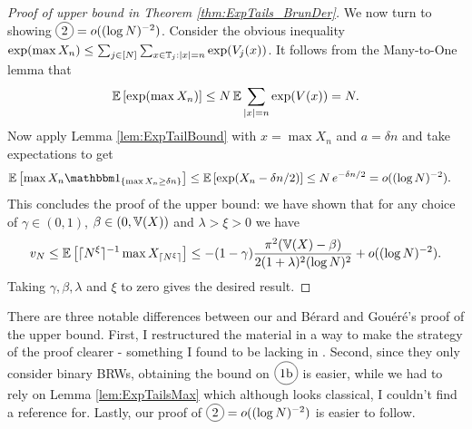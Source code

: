 \begin{proof}[Proof of upper bound in Theorem \ref{thm:ExpTails_BrunDer}]
We now turn to showing $\circled{2} = o((\log N)^{-2})$. Consider the obvious inequality $\exp(\max X_n) \leq \sum_{j \in [N]} \sum_{x \in \mathbb{T}_j : |x| = n} \exp(V_j(x))$. It follows from the Many-to-One lemma that 
\begin{align*}
\mathbb{E}\left[ \exp(\max X_n) \right] \leq N\, \mathbb{E}\sum\limits_{|x| = n} \exp(V(x)) = N. 
\end{align*}
Now apply Lemma \ref{lem:ExpTailBound} with $x = \max X_n$ and $a = \delta n$ and take expectations to get 
\begin{align*}
\Ex{\max X_n \Ind_{\{\max X_n \geq \delta n \}}} &\leq \Ex{\exp(X_n - \delta n / 2)} \leq N \, e^{-\delta n / 2} = o((\log N)^{-2}).
\end{align*}
This concludes the proof of the upper bound: we have shown that for any choice of $\gamma \in (0,1)$, $\beta \in (0, \mathbb{V}(X))$ and $\lambda > \xi > 0$ we have
\begin{equation}\label{eqn:ExpTailResultTally}
v_N \leq \mathbb{E}\left[ \lceil N^\xi\rceil^{-1} \max X_{\lceil N^\xi\rceil} \right] \leq - (1 - \gamma) \frac{\pi^2 (\mathbb{V}(X) - \beta)}{2 (1 + \lambda)^2(\log N)^2} + o((\log N)^{-2}). 
\end{equation}
Taking $\gamma, \beta, \lambda$ and $\xi$ to zero gives the desired result. 
\end{proof}

\begin{remark}
There are three notable differences between our and Bérard and Gouéré's proof of the upper bound. First, I restructured the material in a way to make the strategy of the proof clearer - something I found to be lacking in \cite{exp_tails}. Second, since they only consider binary BRWs, obtaining the bound on $\circled{1b}$ is easier, while we had to rely on Lemma \ref{lem:ExpTailsMax} which although looks classical, I couldn't find a reference for. Lastly, our proof of $\circled{2} = o((\log N)^{-2})$ is easier to follow. 
\end{remark}

